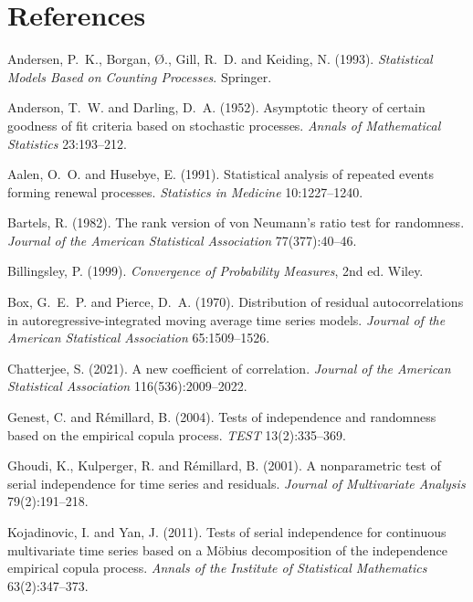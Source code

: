 \documentclass[11pt,a4paper]{article}
\begin{document}
\section*{References}

\begin{description}[leftmargin=1.2em,labelindent=0em,itemsep=1pt,font=\normalfont]
\item Andersen, P.~K., Borgan, Ø., Gill, R.~D. and Keiding, N. (1993).
\emph{Statistical Models Based on Counting Processes}. Springer.
\item Anderson, T.~W. and Darling, D.~A. (1952). Asymptotic theory of certain goodness of
fit criteria based on stochastic processes. \emph{Annals of Mathematical Statistics}
23:193--212.
\item Aalen, O.~O. and Husebye, E. (1991). Statistical analysis of repeated events
forming renewal processes. \emph{Statistics in Medicine} 10:1227--1240.
\item Bartels, R. (1982). The rank version of von Neumann's ratio test for randomness.
\emph{Journal of the American Statistical Association} 77(377):40--46.
\item Billingsley, P. (1999). \emph{Convergence of Probability Measures}, 2nd ed. Wiley.
\item Box, G.~E.~P. and Pierce, D.~A. (1970). Distribution of residual autocorrelations
in autoregressive-integrated moving average time series models. \emph{Journal of the
American Statistical Association} 65:1509--1526.
\item Chatterjee, S. (2021). A new coefficient of correlation. \emph{Journal of the
American Statistical Association} 116(536):2009--2022.
\item Genest, C. and Rémillard, B. (2004). Tests of independence and randomness based on
the empirical copula process. \emph{TEST} 13(2):335--369.
\item Ghoudi, K., Kulperger, R. and Rémillard, B. (2001). A nonparametric test of serial
independence for time series and residuals. \emph{Journal of Multivariate Analysis}
79(2):191--218.
\item Kojadinovic, I. and Yan, J. (2011). Tests of serial independence for continuous
multivariate time series based on a Möbius decomposition of the independence empirical
copula process. \emph{Annals of the Institute of Statistical Mathematics}
63(2):347--373.

\end{description}
\end{document}
